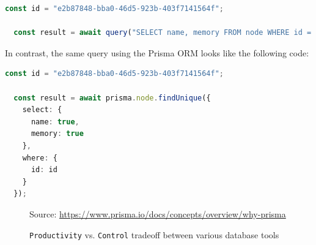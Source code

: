 \begin{lstlisting}[language=typescript, xleftmargin=\parindent, morekeywords={[2]{id, result}}, morekeywords={[3]{query}}, caption=Raw SQL query to retrieve the \texttt{name} and \texttt{memory} attributes of the node with the identifier \texttt{e2b87848-bba0-46d5-923b-403f7141564f}]
  const id = "e2b87848-bba0-46d5-923b-403f7141564f";

  const result = await query("SELECT name, memory FROM node WHERE id = $1", [id]);
\end{lstlisting}

In contrast, the same query using the Prisma ORM looks like the following code:

\begin{lstlisting}[language=typescript, xleftmargin=\parindent, morekeywords={[2]{id, result, prisma, node, select, name, memory, where}}, morekeywords={[3]{findUnique}}, caption=Prisma ORM query to retrieve the \texttt{name} and \texttt{memory} attributes of the node with the identifier \texttt{e2b87848-bba0-46d5-923b-403f7141564f}]
  const id = "e2b87848-bba0-46d5-923b-403f7141564f";

  const result = await prisma.node.findUnique({
    select: {
      name: true,
      memory: true
    },
    where: {
      id: id
    }
  });
\end{lstlisting}

\begin{figure} %
  \centering
  \def\stackalignment{r} %
  {\scriptsize \parbox[t]{\linewidth}{ Source: \url{https://www.prisma.io/docs/concepts/overview/why-prisma}} }
  \caption{\texttt{Productivity}
  vs.
  \texttt{Control}
  tradeoff
  between
  various
  database
  tools}
  \label{fig:orm_productivity_control}
\end{figure}

